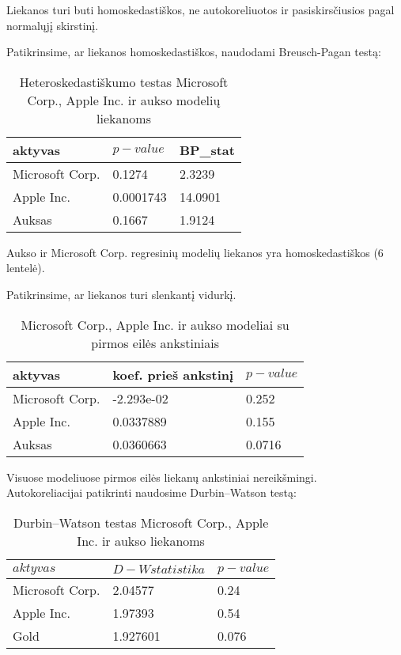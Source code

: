 \documentclass[12pt, a14paper, lithuanian]{article}
\begin{document}
Liekanos turi buti homoskedastiškos, ne autokoreliuotos ir pasiskirsčiusios pagal normalųjį skirstinį.

Patikrinsime, ar liekanos homoskedastiškos, naudodami Breusch-Pagan testą:

\begin{table}[ht]
\begin{center}
    \begin{tabular}{ | l | l | l |}
    \hline
    aktyvas  & $ p-value $ & BP_{stat} \\
    \hline
  Microsoft Corp. & 0.1274 & 2.3239\\
	Apple Inc. & 0.0001743 & 14.0901\\
	Auksas &  0.1667 & 1.9124\\
	\hline
    \end{tabular}
\end{center}
\caption{Heteroskedastiškumo testas Microsoft Corp., Apple Inc. ir aukso modelių liekanoms}
\end{table}

Aukso ir Microsoft Corp. regresinių modelių liekanos yra homoskedastiškos (6 lentelė).

Patikrinsime, ar liekanos turi slenkantį vidurkį.

\begin{table}[ht]
\begin{center}
    \begin{tabular}{ | l | l | l | }
    \hline
    aktyvas  &  koef. prieš ankstinį  & $ p-value $  \\
    \hline
	Microsoft Corp. & -2.293e-02 & 0.252\\
	Apple Inc. & 0.0337889 &  0.155\\
	Auksas & 0.0360663 &  0.0716\\
	\hline
    \end{tabular}
\end{center}
\caption{Microsoft Corp., Apple Inc. ir aukso modeliai su pirmos eilės ankstiniais}
\end{table}

Visuose modeliuose pirmos eilės liekanų ankstiniai nereikšmingi.\\

Autokoreliacijai patikrinti naudosime Durbin--Watson testą:



\begin{table}[ht]
\begin{center}
    \begin{tabular}{ | l | l | l | }
    \hline
    $ aktyvas $ & $ D-W statistika $ & $ p-value $  \\
    \hline
	Microsoft Corp. & 2.04577 &  0.24\\
	Apple Inc. & 1.97393 &  0.54\\
	Gold & 1.927601 &  0.076\\
	\hline
    \end{tabular}
\end{center}
\caption{Durbin--Watson testas Microsoft Corp., Apple Inc. ir aukso liekanoms}
\end{table}
\end{document}
